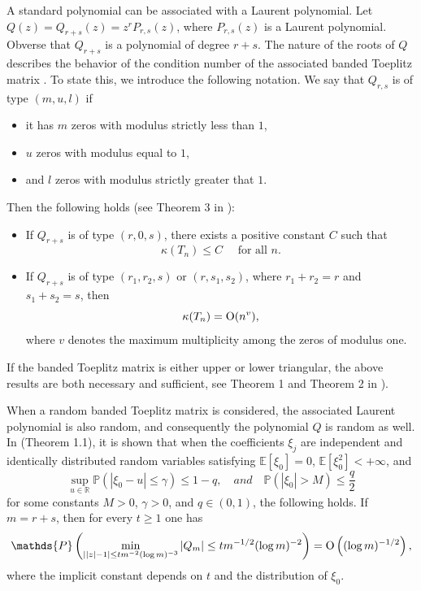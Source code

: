 \documentclass[12pt]{amsart}
\theoremstyle{plain}
\numberwithin{equation}{section}
\renewcommand{\Pr}{\mathbb{P}}
\newcommand{\<}{\langle}
\renewcommand{\>}{\rangle}
\newcommand{\PP}[1]{\left(#1\right)}
\newcommand{\R}{\mathds{R}}
\newcommand{\E}[2][ ]{\mathbb{E}{#1}\left[#2\right]}
\newcommand{\abs}[1]{\left|#1\right|}
\renewcommand{\Pr}[1]{\mathds{P}\left(#1\right)}
\begin{document}
A standard polynomial can be associated with a Laurent polynomial. Let $Q(z)=Q_{r+s}(z)=z^rP_{r,s}(z)$, where $P_{r,s}(z)$ is a Laurent polynomial. Obverse that $Q_{r+s}$ is a polynomial of degree $r+s$. The nature of the roots of $Q$ describes the behavior of the condition number of the associated banded Toeplitz matrix \cite{amodio1996conditioning}. To state this, we introduce the following notation. We say that $Q_{r,s}$ is of type $(m,u,l)$ if 
\begin{itemize}
\item it has $m$ zeros with modulus strictly less than $1$,
\item $u$ zeros with modulus equal to $1$,
\item and $l$ zeros with modulus strictly greater that $1$.
\end{itemize}
Then the following holds (see Theorem 3 in \cite{amodio1996conditioning}):
\begin{itemize}
\item If $Q_{r+s}$ is of type $(r,0,s)$, there exists a positive constant $C$ such that \[ \kappa(T_n)\leq C \quad \mbox{ for all $n$}.\]
\item If $Q_{r+s}$ is of type $(r_1,r_2,s)$ or $(r,s_1,s_2)$, where $r_1+r_2=r$ and $s_1+s_2=s$, then \[ \kappa(T_n) = \textnormal{O}(n^{v}), \] where $v$ denotes the maximum multiplicity among the zeros of modulus one.
\end{itemize} 

If the banded Toeplitz matrix is either upper or lower triangular, the above results are both necessary and sufficient, see Theorem 1 and Theorem 2  in \cite{amodio1996conditioning}).

When a random banded Toeplitz matrix is considered, the associated Laurent polynomial is also random, and consequently the polynomial $Q$ is random as well. In \cite{barrera2022zero} (Theorem 1.1), it is shown that when the coefficients $\xi_j$ are independent and identically distributed random variables satisfying $\E{\xi_0}=0$, $\E{\xi_0^2}<+\infty$, and
\[
\sup_{u\in\R} \Pr{\abs{\xi_0 - u}\leq \gamma} \leq 1-q,\quad and\quad \Pr{\abs{\xi_0}>M} \leq \frac{q}{2}
\]
for some constants $M>0$, $\gamma>0$, and $q\in(0,1)$, the following holds. If $m=r+s$, then for every $t\geq 1$ one has
\[
\Pr{\min_{\abs{\abs{z}-1} \leq t m^{-2}(\log m)^{-3}} \abs{Q_{m}} \leq t m^{-1/2}(\log m)^{-2} } = \textnormal{O}\PP{(\log m)^{-1/2}},
\]
where the implicit constant depends on $t$ and the distribution of $\xi_0$.
\end{document}
